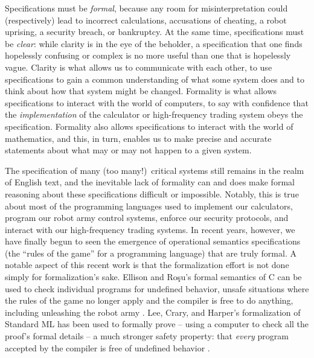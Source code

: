 Specifications must be {\it formal}, because any room for
misinterpretation could (respectively) lead to incorrect calculations,
accusations of cheating, a robot uprising, a security breach, or
bankruptcy. At the same time, specifications must be {\it clear}:
while clarity is in the eye of the beholder, a specification
that one finds hopelessly confusing or complex is no more useful than
one that is hopelessly vague.
%
Clarity is what allows us to
communicate with each other, to use specifications to gain a common
understanding of what some system does and to think about how that
system might be changed. Formality is what allows specifications to
interact with the world of computers, to say with confidence that the
{\it implementation} of the calculator or high-frequency trading
system obeys the specification. Formality also allows specifications
to interact with the world of mathematics, and this, in turn, enables
us to make precise and accurate statements about what may or may not
happen to a given system.

The specification of many (too many!)~critical systems still remains
in the realm of English text, and the inevitable lack of formality can
and does make formal reasoning about these specifications difficult or
impossible.
%
Notably, this is true about most of the programming languages used to
implement our calculators, program our robot army control systems,
enforce our security protocols, and interact with our high-frequency
trading systems. In recent years, however, we have finally begun to
seen the emergence of operational semantics specifications (the
``rules of the game'' for a programming language) that are truly
formal. A notable aspect of this recent work is that the formalization
effort is not done simply for formalization's sake. Ellison and Ro{\c
  s}u's formal semantics of C can be used to check individual programs
for undefined behavior, unsafe situations where the rules of the game
no longer apply and the compiler is free to do anything, including
unleashing the robot army \cite{ellison12executable}. Lee, Crary, and
Harper's formalization of Standard ML has been used to formally prove
-- using a computer to check all the proof's formal details -- a much
stronger safety property: that {\it every} program accepted by the
compiler is free of undefined behavior \cite{lee07towards}.

